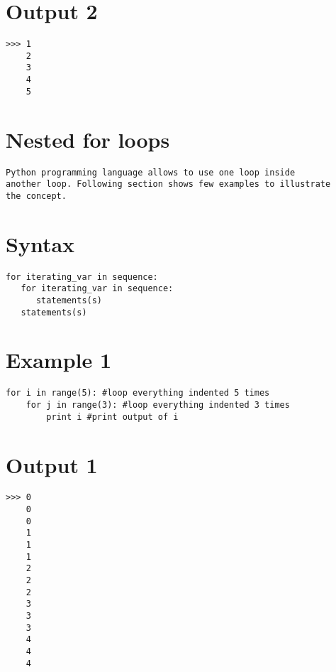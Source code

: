 \section{Output 2}
\begin{shaded}
\begin{verbatim}
>>> 1
    2
    3
    4
    5
\end{verbatim}
\end{shaded}

\vspace{2cm}

\section{Nested for loops}
\begin{verbatim}
Python programming language allows to use one loop inside 
another loop. Following section shows few examples to illustrate
the concept.
\end{verbatim}


\section{Syntax}
\begin{verbatim}
for iterating_var in sequence:
   for iterating_var in sequence:
      statements(s)
   statements(s)
\end{verbatim}

\section{Example 1}   
\begin{shaded}
\begin{verbatim}
for i in range(5): #loop everything indented 5 times
    for j in range(3): #loop everything indented 3 times
        print i #print output of i

\end{verbatim}
\end{shaded}

\vspace{3cm}
\section{Output 1}
\begin{shaded}
\begin{verbatim}
>>> 0
    0
    0
    1
    1
    1
    2
    2
    2
    3
    3
    3
    4
    4
    4
\end{verbatim}
\end{shaded}

